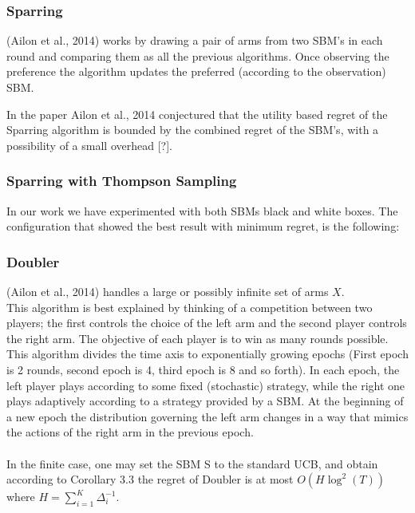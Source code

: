 \documentclass{llncs}
\begin{document}
\subsubsection{Sparring}
	(Ailon et al., 2014) works by drawing a pair of arms from two SBM's in each round and comparing them as all the previous algorithms. Once observing the preference the algorithm updates the preferred (according to the observation) SBM.  
	
		
	\begin{conjecture}
 		In the paper Ailon et al., 2014 conjectured that the utility based regret of the Sparring algorithm is bounded by the combined regret of the SBM's, with a possibility of a small overhead [?].
 	\end{conjecture}		
		
	\subsubsection{Sparring with Thompson Sampling}
		In our work  we have experimented with both SBMs black and white boxes. The configuration that showed the best result with minimum regret, is the following: 
		
		
	\subsubsection{Doubler}
(Ailon et al., 2014) handles a large or possibly infinite set of arms $X$. 
\\
This algorithm is best explained by thinking of a competition between
two players; the first controls the choice of the left arm and
the second player controls the right arm. The objective of each
player is to win as many rounds possible.
\\
This algorithm divides the time axis to exponentially growing epochs (First epoch is 2 rounds, second epoch is 4, third epoch is 8 and so forth).
In each epoch, the left player plays according to some fixed
(stochastic) strategy, while the right one plays adaptively according to a strategy provided by a SBM. At the beginning of a new epoch the distribution governing the left arm changes in a way that mimics the actions of the right arm in the previous epoch.\\
			
		\\
		In the finite case, one may set the SBM S to the standard
UCB, and obtain according to Corollary 3.3 the regret of Doubler is at most $O(H \log^2 (T))$ where $H=\sum_{i=1}^K \Delta^{-1}_i$.
\newpage
\end{document}
